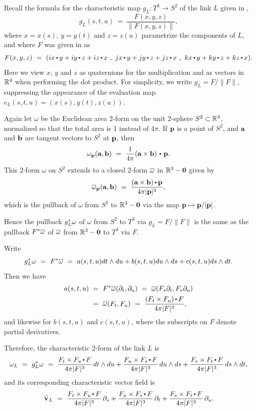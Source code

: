 Recall the formula for the characteristic map $g_L\colon T^3\to S^2$ of the link $L$ given in ,
$$
g_L(s,t,u) \ = \ \frac{F(x,y,z)}{\| F(x,y,z)\|},
$$
where $x=x(s)$, $y=y(t)$ and $z=z(u)$ parametrize the components of $L$,
and where $F$ was given in  as
$$
F(x,y,z) \ = \  (ix\dt y + iy\dt z + iz\dt x \ , \  jx\dt y + jy\dt z + jz\dt x \ , \  kx\dt y + ky\dt z + kz\dt x).
$$
Here we view $x$, $y$ and $z$ as quaternions for the multiplication and as vectors in $\mathbb R^4$ when performing the dot product.   For simplicity, we write $g_L=F/\| F\|$, suppressing the appearance of the evaluation map $e_L(s,t,u)=(x(s),y(t),z(u))$.

Again let $\omega$ be the Euclidean area 2-form on the unit 2-sphere 
$S^2\subset\mathbb R^3$, normalized so that the total area is 1 instead of $4\pi$.
If $\textup{\bf p}$ is a point of $S^2$, and $\textup{\bf a}$ and $\textup{\bf b}$ are tangent vectors to $S^2$
at $\textup{\bf p}$, then 
$$
\omega_{\p}(\a,\b) \ = \ \frac1{4\pi}(\a\times\b)\dtw\p.
$$
This 2-form $\omega$ on $S^2$ extends to a closed 2-form $\overline\omega$ in 
$\mathbb R^3-{\bf0}$ given by
$$
\bah{\omega}_{\p}(\a,\b) \ = \ {(\a\times\b)\dt\p\over 4\pi\|\p\|^3},
$$
which is the pullback of $\omega$ from $S^2$ to $\mathbb R^3-{\bf0}$ via the 
map $\textup{\bf p}\mapsto \textup{\bf p}/|\textup{\bf p}|$.

Hence the pullback $g_L^*\omega$ of $\omega$ from $S^2$ to $T^3$ via
$g_L=F/\| F\|$ is the same as the pullback $F^*\overline\omega$
of $\overline\omega$ from $\mathbb R^3-{\bf0}$ to $T^3$ via $F$.

Write
$$g_L^\dast\omega \ = \ F^\dast\bah{\omega} 
\ = \ a(s,t,u)dt\wedge du+b(s,t,u)du\wedge ds+c(s,t,u)ds\wedge dt.$$
Then we have
$$
\aligned
a(s,t,u)& \ = \  F^\dast\bah\omega({\partial_t},{\partial_u}) \ = \  \bah\omega(F_\dast{\partial_t}, F_\dast{\partial_u}) \\
& \ = \ \bah{\omega}(F_t,F_u) \ = \  \frac{(F_t\times F_u)\dt F}{4\pi\| F\|^3},
\endaligned
$$
and likewise for $b(s,t,u)$ and $c(s,t,u)$, where the subscripts on $F$ denote
partial derivatives.

Therefore, the characteristic 2-form of the link $L$ is
$$\omega_L \ = \  g_L^\dast\omega \ = \ 
\frac{F_t\times F_u\dt F}{4\pi\| F\|^3}  \, dt\wedge du
+\frac{F_u\times F_s\dt F}{4\pi\| F\|^3} \, du\wedge ds
+\frac{F_s\times F_t\dt F}{4\pi\| F\|^3} \, ds\wedge dt,$$
and its corresponding characteristic vector field is 
$$\vec_L \ = \ 
\frac{F_t\times F_u\dt F}{4\pi\| F\|^3} \, \partial_s
+\frac{F_u\times F_s\dt F}{4\pi\| F\|^3} \, \partial_t
+\frac{F_s\times F_t\dt F}{4\pi\| F\|^3} \, \partial_u.$$


